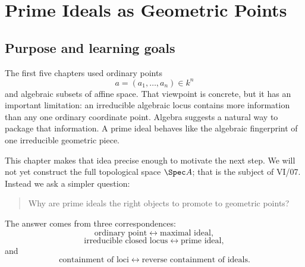 %
%

\chapter{Prime Ideals as Geometric Points}
\label{ch:prime-ideals-geometric-points}

\section*{Purpose and learning goals}

The first five chapters used ordinary points
\[
a=(a_1,\dots,a_n)\in k^n
\]
and algebraic subsets of affine space.  That viewpoint is concrete, but it has an important
limitation: an irreducible algebraic locus contains more information than any one ordinary
coordinate point.  Algebra suggests a natural way to package that information.  A prime
ideal behaves like the algebraic fingerprint of one irreducible geometric piece.

This chapter makes that idea precise enough to motivate the next step.  We will not yet
construct the full topological space \(\Spec A\); that is the subject of VI/07.  Instead we
ask a simpler question:

\begin{quote}
Why are prime ideals the right objects to promote to geometric points?
\end{quote}

The answer comes from three correspondences:
\[
\text{ordinary point}
\longleftrightarrow
\text{maximal ideal},
\]
\[
\text{irreducible closed locus}
\longleftrightarrow
\text{prime ideal},
\]
and
\[
\text{containment of loci}
\longleftrightarrow
\text{reverse containment of ideals}.
\]

